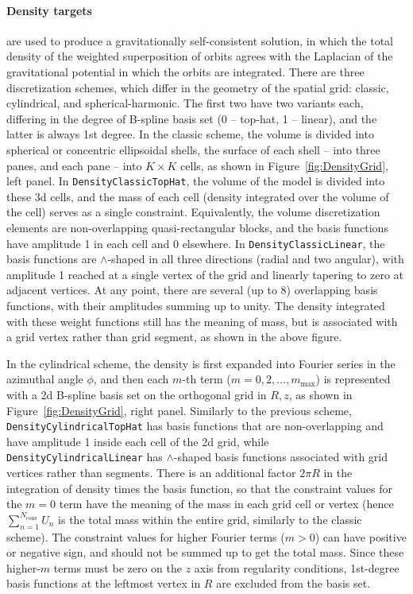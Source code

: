 \documentclass[12pt]{article}
\newcommand{\ppp}[1]{\textcolor{darkolive} {\texttt{#1}}}
\let\oldparagraph\paragraph
\renewcommand{\paragraph}[1]{\vspace{-2mm}\oldparagraph{#1}}
\begin{document}
\paragraph{Density targets} are used to produce a gravitationally self-consistent solution, in which the total density of the weighted superposition of orbits agrees with the Laplacian of the gravitational potential in which the orbits are integrated.
There are three discretization schemes, which differ in the geometry of the spatial grid: classic, cylindrical, and spherical-harmonic. The first two have two variants each, differing in the degree of B-spline basis set (0 -- top-hat, 1 -- linear), and the latter is always 1st degree. 
In the classic scheme, the volume is divided into spherical or concentric ellipsoidal shells, the surface of each shell -- into three panes, and each pane -- into $K\times K$ cells, as shown in Figure~\ref{fig:DensityGrid}, left panel. In \ppp{DensityClassicTopHat}, the volume of the model is divided into these 3d cells, and the mass of each cell (density integrated over the volume of the cell) serves as a single constraint. Equivalently, the volume discretization elements are non-overlapping quasi-rectangular blocks, and the basis functions have amplitude 1 in each cell and 0 elsewhere. In \ppp{DensityClassicLinear}, the basis functions are $\wedge$-shaped in all three directions (radial and two angular), with amplitude 1 reached at a single vertex of the grid and linearly tapering to zero at adjacent vertices. At any point, there are several (up to 8) overlapping basis functions, with their amplitudes summing up to unity. The density integrated with these weight functions still has the meaning of mass, but is associated with a grid vertex rather than grid segment, as shown in the above figure.

In the cylindrical scheme, the density is first expanded into Fourier series in the azimuthal angle $\phi$, and then each $m$-th term ($m=0, 2, \dots, m_\mathrm{max}$) is represented with a 2d B-spline basis set on the orthogonal grid in $R,z$, as shown in Figure~\ref{fig:DensityGrid}, right panel. Similarly to the previous scheme, \ppp{DensityCylindricalTopHat} has basis functions that are non-overlapping and have amplitude 1 inside each cell of the 2d grid, while \ppp{DensityCylindricalLinear} has $\wedge$-shaped basis functions associated with grid vertices rather than segments. There is an additional factor $2\pi R$ in the integration of density times the basis function, so that the constraint values for the $m=0$ term have the meaning of the mass in each grid cell or vertex (hence $\sum_{n=1}^{N_\mathrm{cons}} U_n$ is the total mass within the entire grid, similarly to the classic scheme). The constraint values for higher Fourier terms ($m>0$) can have positive or negative sign, and should not be summed up to get the total mass. Since these higher-$m$ terms must be zero on the $z$ axis from regularity conditions, 1st-degree basis functions at the leftmost vertex in $R$ are excluded from the basis set.
\end{document}
